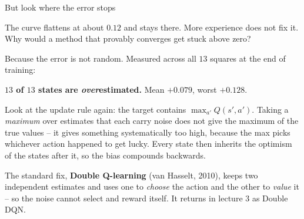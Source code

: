 \documentclass[aspectratio=169]{beamer}
\begin{document}
\begin{frame}{But look where the error stops}
  \begin{tcolorbox}[colback=armorange!12, colframe=armorange, boxrule=0.7pt, arc=2pt]
    The curve flattens at about $0.12$ and stays there. More experience does not fix it. Why
    would a method that provably converges get stuck above zero?
  \end{tcolorbox}

  \vskip 6pt
  \footnotesize
  Because the error is not random. Measured across all $13$ squares at the end of training:

  \vskip 3pt
  \begin{center}
    \textbf{$13$ of $13$ states are \emph{over}estimated.} Mean $+0.079$, worst $+0.128$.
  \end{center}

  \vskip 6pt
  \begin{tcolorbox}[colback=armblue!8, colframe=armblue, boxrule=0.6pt, arc=2pt,
                    title={\textbf{Maximisation bias}}]
    \footnotesize
    Look at the update rule again: the target contains $\max_{a'} Q(s',a')$. Taking a
    \emph{maximum} over estimates that each carry noise does not give the maximum of the true
    values -- it gives something systematically too high, because the max picks whichever
    action happened to get lucky. Every state then inherits the optimism of the states after
    it, so the bias compounds backwards.
  \end{tcolorbox}

  \vskip 5pt
  \footnotesize
  The standard fix, \textbf{Double Q-learning} (van Hasselt, 2010), keeps two independent
  estimates and uses one to \emph{choose} the action and the other to \emph{value} it -- so the
  noise cannot select and reward itself. It returns in lecture 3 as Double DQN.
\end{frame}
\end{document}
